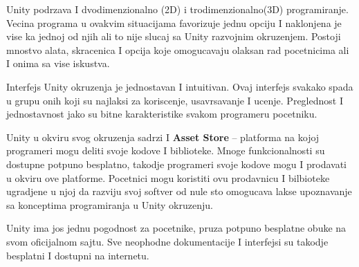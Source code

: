 \documentclass[12pt]{article}
\begin{document}
Unity podrzava I dvodimenzionalno (2D) i trodimenzionalno(3D) programiranje. Vecina programa u ovakvim situacijama favorizuje jednu opciju I naklonjena je vise ka jednoj od njih ali to nije slucaj sa Unity razvojnim okruzenjem. Postoji mnostvo alata, skracenica I opcija koje omogucavaju olaksan rad pocetnicima ali I onima sa vise iskustva. 

Interfejs Unity okruzenja je jednostavan I intuitivan. 
Ovaj interfejs svakako spada u grupu onih koji su najlaksi za koriscenje, usavrsavanje I ucenje. Preglednost I jednostavnost jako su bitne karakteristike svakom programeru pocetniku. 

Unity u okviru svog okruzenja sadrzi I \textbf{Asset Store} – platforma na kojoj programeri mogu deliti svoje kodove I biblioteke. Mnoge funkcionalnosti su dostupne potpuno besplatno, takodje programeri svoje kodove mogu I prodavati u okviru ove platforme. Pocetnici mogu koristiti ovu prodavnicu I bilbioteke ugradjene u njoj da razviju svoj softver od nule sto omogucava lakse upoznavanje sa konceptima programiranja u Unity okruzenju.

 Unity ima jos jednu pogodnost za pocetnike, pruza potpuno besplatne obuke 
na svom oficijalnom sajtu. Sve neophodne dokumentacije I interfejsi su takodje besplatni I dostupni na internetu.
\end{document}
